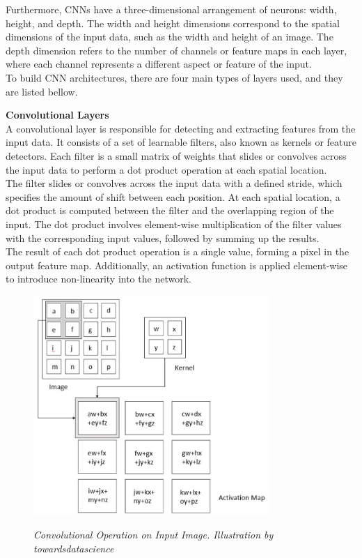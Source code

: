 Furthermore, CNNs have a three-dimensional arrangement of neurons: width, height, and depth. The width and height dimensions correspond to the spatial dimensions of the input data, such as the width and height of an image. The depth dimension refers to the number of channels or feature maps in each layer, where each channel represents a different aspect or feature of the input. \\

To build CNN architectures, there are four main types of layers used, and they are listed bellow. \\

\newpage

\vspace{0.5cm}
\textbf{Convolutional Layers} \\

A convolutional layer is responsible for detecting and extracting features from the input data. It consists of a set of learnable filters, also known as kernels or feature detectors. Each filter is a small matrix of weights that slides or convolves across the input data to perform a dot product operation at each spatial location.  \\

The filter slides or convolves across the input data with a defined stride, which specifies the amount of shift between each position.
At each spatial location, a dot product is computed between the filter and the overlapping region of the input.
The dot product involves element-wise multiplication of the filter values with the corresponding input values, followed by summing up the results. \\

The result of each dot product operation is a single value, forming a pixel in the output feature map. Additionally, an activation function is applied element-wise to introduce non-linearity into the network. \\

\begin{figure}[H]
\centering
\includegraphics[width=0.8\textwidth]{imatges/preliminaries/convolutional-layer.png}
\caption[Convolutional Operation on Input Image]{\textit{Convolutional Operation on Input Image. Illustration by towardsdatascience}}
{\label{fig:convoluional-layer}}
\end{figure}

